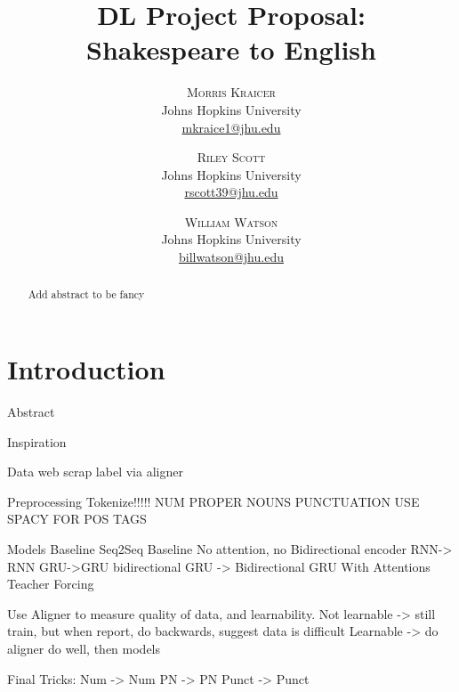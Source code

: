 \documentclass[twoside,twocolumn]{article}
\title{DL Project Proposal:\\Shakespeare to English}
\author{%
\textsc{Morris Kraicer} \\[1ex]
\normalsize Johns Hopkins University \\
\normalsize \href{mailto:mkraice1@jhu.edu}{mkraice1@jhu.edu}
 \and
 \textsc{Riley Scott} \\[1ex]
\normalsize Johns Hopkins University \\
\normalsize \href{mailto:rscott39@jhu.edu}{rscott39@jhu.edu}
 \and
  \textsc{William Watson} \\[1ex]
\normalsize Johns Hopkins University \\
\normalsize \href{mailto:billwatson@jhu.edu}{billwatson@jhu.edu}
}
\date{}%
\begin{document}
\maketitle





\begin{abstract}
\noindent
Add abstract to be fancy
\end{abstract}

\section{Introduction}
\cite{bahdanau2014neural}
\cite{luong2015effective}
\cite{liu2016neural}
\cite{cho2014learning}
\cite{sutskever2014sequence}
\cite{papineni2002bleu}
Abstract

Inspiration

Data
	web scrap
	label via aligner

Preprocessing
	Tokenize!!!!!
		NUM
		PROPER NOUNS
		PUNCTUATION
		USE SPACY FOR POS TAGS

Models
	Baseline
		Seq2Seq Baseline
			No attention, no Bidirectional
			encoder RNN-> RNN
		GRU->GRU
		bidirectional GRU -> Bidirectional GRU
		With Attentions
		Teacher Forcing

	Use Aligner to measure quality of data, and learnability.
		Not learnable -> still train, but when report, do backwards, suggest data is difficult
		Learnable -> do aligner do well, then models

Final Tricks:
	Num -> Num
	PN -> PN
	Punct -> Punct
\end{document}
